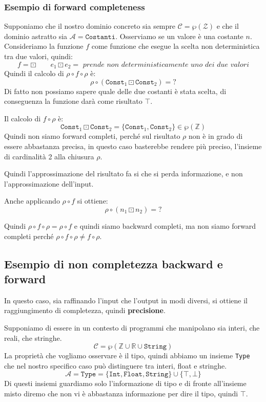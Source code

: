 \subsubsection{Esempio di forward completeness}
Supponiamo che il nostro dominio concreto sia sempre $\mathcal{C} = \wp(\mathcal{Z})$ e che
il dominio astratto sia $\mathcal{A} = \texttt{Costanti}$.
Osserviamo se un valore è una costante $n$. Consideriamo la funzione $f$ come funzione che esegue 
la scelta non deterministica tra due valori, quindi:
\[
    f = \boxdot  \qquad e_1 \boxdot e_2 = \textit{ prende non deterministicamente uno dei due valori}
\]
Quindi il calcolo di $\rho \circ f \circ \rho$ è: 
\[
  \rho \circ (\texttt{Const}_1 \boxdot \texttt{Const}_2) = ?
\]
Di fatto non possiamo sapere quale delle due costanti è stata scelta, di conseguenza 
la funzione darà come risultato $\top$.

Il calcolo di $f \circ \rho$ è:
\[
    \texttt{Const}_1 \boxdot \texttt{Const}_2 = \{\texttt{Const}_1 , \texttt{Const}_2\} \in \wp(\mathbb{Z})
\]
Quindi non siamo forward completi, perché sul risultato $\rho$ non è in grado di essere abbastanza precisa,
in questo caso basterebbe rendere più preciso, l'insieme di cardinalità 2 alla chiusura $\rho$.

Quindi l'approssimazione del risultato fa si che si perda informazione, e non l'approssimazione dell'input.

Anche applicando $\rho \circ f$ si ottiene:
\[
    \rho \circ (n_1 \boxdot n_2) = ?
\]
\begin{tcolorbox}
    Quindi $\rho \circ f \circ \rho = \rho \circ f $ e quindi siamo backward completi, ma 
    non siamo forward completi perché $\rho \circ f \circ \rho \not = f \circ \rho$.
\end{tcolorbox}
\subsection{Esempio di non completezza backward e forward}
In questo caso, sia raffinando l'input che l'output in modi diversi, si ottiene 
il raggiungimento di completezza, quindi \textbf{precisione}.

Supponiamo di essere in un contesto di programmi che manipolano sia interi, che 
reali, che stringhe.
\[
    \mathcal{C} = \wp(\mathbb{Z} \cup \mathbb{R} \cup \texttt{String})
\]
La proprietà che vogliamo osservare è il tipo, quindi abbiamo un insieme \texttt{Type} che 
nel nostro specifico caso può distinguere tra interi, float e stringhe.
\[
    \mathcal{A} = \texttt{Type} = \{\texttt{Int}, \texttt{Float}, \texttt{String}\}
    \cup \{\top, \bot\}
\]
Di questi insiemi guardiamo solo l'informazione di tipo e di fronte all'insieme misto 
diremo che non vi è abbastanza informazione per dire il tipo, quindi $\top$.

